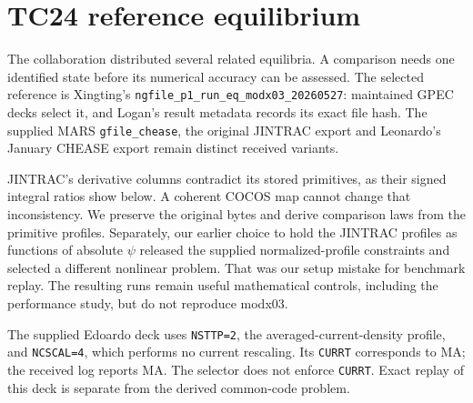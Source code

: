 \documentclass[10pt,a4paper]{article}
\newcommand{\pageheading}[1]{\clearpage\section{#1}}
\begin{document}
\pageheading{TC24 reference equilibrium}
The collaboration distributed several related equilibria. A comparison needs
one identified state before its numerical accuracy can be assessed. The
selected reference is Xingting's \texttt{ngfile\_p1\_run\_eq\_modx03\_20260527}:
maintained GPEC decks select it, and Logan's result metadata records its exact
file hash. The supplied MARS \texttt{gfile\_chease}, the original JINTRAC export
and Leonardo's January CHEASE export remain distinct received variants.

\begin{center}\small

\end{center}

JINTRAC's derivative columns contradict its stored primitives, as their
signed integral ratios show below. A coherent COCOS map cannot change that
inconsistency. We preserve the original bytes and derive comparison laws from
the primitive profiles. Separately, our earlier choice to hold the JINTRAC
profiles as functions of absolute $\psi$ released the supplied normalized-profile
constraints and selected a different nonlinear problem. That was our setup
mistake for benchmark replay. The resulting runs remain useful mathematical
controls, including the performance study, but do not reproduce modx03.

\begin{center}\small

\end{center}

The supplied Edoardo deck uses \texttt{NSTTP=2}, the averaged-current-density
profile, and \texttt{NCSCAL=4}, which performs no current rescaling.
Its \texttt{CURRT} corresponds to \SourceHeaderCurrent{} MA; the received log
reports \ReplayLogCurrent{} MA. The selector does not enforce \texttt{CURRT}.
Exact replay of this deck is separate from the derived common-code problem.

\begin{center}\small

\end{center}
\end{document}
